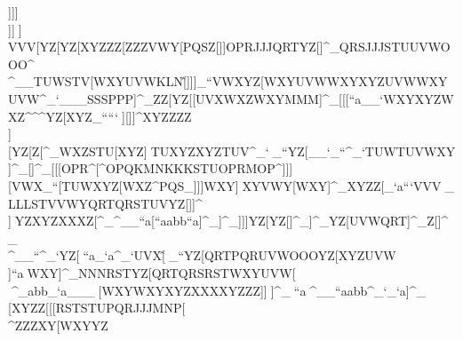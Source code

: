                              ]]]\\]]^^\\]]^^[\\VVV[\]YZ[YZ[XYZZZ[                                                            ZZZVWY[\]PQSZ[\QRSVWX[\]UVWUVW[\]_`a                                                            ^^^``aWXYSTU``a^_`^_`\]^STUSTURST[\^                                                            ]]]OPRJJJQRTYZ[]^_QRSJJJSTUUVWOOO\]^                                                            \\\WXYQRTUVW^__TUWSTV[\]WXYUVWKLN[\^                                                            ]]]_``VWXYZ[WXYUVWWXYXYZUVWWXYUVW^_`                                                            ___SSSPPP]^_ZZ[YZ[[\]UVXWXZWXYMMM]^_                                                            [[[``a__`WXYXYZWXZ\]^\]^\]^YZ[XYZ_``                                                            ```^^_\]][\]]]^XYZZZZ\\][\]YZ[Z[\ZZ[                                                            ZZZ]^_WXZSTU[\]XYZ]^^STUXYZXYZTUV^_`                                                            ^^^_``YZ[__`_``^_`TUWTUVWXY]^_[\]]^_                                                            [[[OPR\]^[\]\]^OPQKMNKKKSTUOPRMOP\]^                                                            ]]][\]VWX_``[\]TUWXYZ[\]WXZ\]^PQS\]_                                                            ]]]WXY]^^WXYVWY[\]WXY]^_XYZZ[\RST_`a                                                            ```VVV\]^^^_LLLSTVVWYQRTQRSTUVYZ[]]^                                                            \\\UVXXYZUVWVWXWXYYZ[UVWXYZYZ[_``_`a                                                            ```_``\\]]^^XYZXYZXXXZ[\XYZZ[\\\][[\                                                            \\\WXYSTU]^_^__``a[\]``aabb``a]^_]^_                                                            ]]]YZ[YZ[]^_]^_YZ[UVWQRT]^_Z[\STU]^_                                                            \\^__``^_`YZ[^^_``a_`a^_`UVX[\^                                                            ^^^_``YZ[QRTPQRUVWOOOYZ[XYZUVW\\]``a                                                            ^^^WXY]^_NNNRSTYZ[QRTQRSRSTWXYUVW[\]                                                            \\\QRSMNPOPRQRTWXYVWXYZ[]^^]^_abb_`a                                                            ___^^_[\]WXYWXYXYZXXXXYZZZ\YZ[[[\ZZ[                                                            ]]]^^_]^_^^_``a^^_^__``aabb^_`_`a]^_                                                            \\\YZ[XYZZ[\YZ[[\]RSTSTUPQRJJJMNP[\]                                                            \\\XYZKMNJJJPQRVWYSTVVWXTUVOPRMNP\]^                                                            ZZZXY[WXYYZ